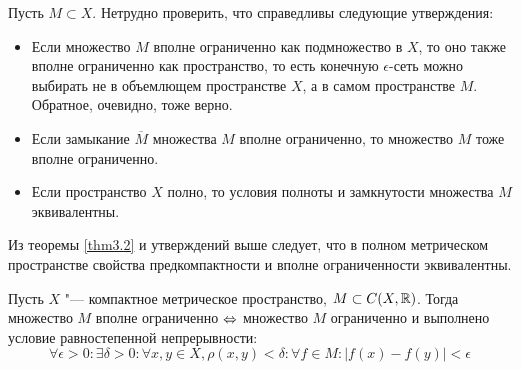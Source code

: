 \begin{note}
    Пусть $M \subset X$. Нетрудно проверить, что справедливы следующие утверждения:
    \begin{itemize}
        \item Если множество $M$ вполне ограниченно как подмножество в $X$, то оно также вполне ограниченно как пространство, то есть конечную $\epsilon$-сеть можно выбирать не в объемлющем пространстве $X$, а в самом пространстве $M$. Обратное, очевидно, тоже верно.
        
        \item Если замыкание $\overline M$ множества $M$ вполне ограниченно, то множество $M$ тоже вполне ограниченно.
        
        \item Если пространство $X$ полно, то условия полноты и замкнутости множества $M$ эквивалентны.
    \end{itemize}

    Из теоремы \ref{thm3.2} и утверждений выше следует, что в полном метрическом пространстве свойства предкомпактности и вполне ограниченности эквивалентны.
\end{note}

\begin{theorem}
    Пусть $X$ "--- компактное метрическое пространство, $M \subset C(X, \mathbb{R})$. Тогда множество $M$ вполне ограниченно $\Leftrightarrow$ множество $M$ ограниченно и выполнено условие равностепенной непрерывности:
    \[
        \forall \epsilon > 0: \exists \delta > 0: \forall x, y \in X, \rho(x, y) < \delta: \forall f \in M: |f(x) - f(y)| < \epsilon 
    \]
\end{theorem}

